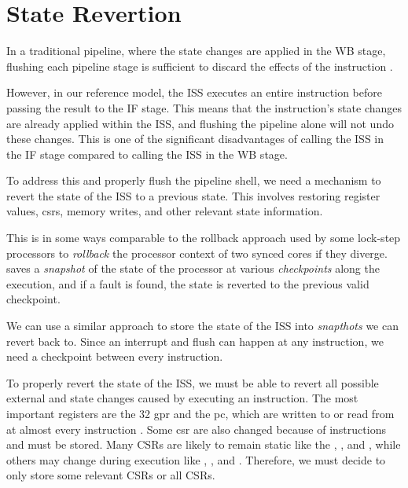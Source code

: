 %


\section{State Revertion}
\label{sec:ps_revertion}

In a traditional pipeline, where the state changes are applied in the WB stage, flushing each pipeline stage is sufficient to discard the effects of the instruction \cite{pattersonComputerOrganizationDesign2021}.

However, in our reference model, the ISS executes an entire instruction before passing the result to the IF stage.
This means that the instruction's state changes are already applied within the ISS, and flushing the pipeline alone will not undo these changes. This is one of the significant disadvantages of calling the ISS in the IF stage compared to calling the ISS in the WB stage.

To address this and properly flush the pipeline shell, we need a mechanism to revert the state of the ISS to a previous state.
This involves restoring register values, \acrshort{csr}s, memory writes, and other relevant state information.

This is in some ways comparable to the rollback approach used by some lock-step processors \cite{marquesLockVHeterogeneousFault2021, liDuckCoreFaultTolerantProcessor2021, nikiemaDesignLowComplexity2023} to \textit{rollback} the processor context of two synced cores if they diverge. \textcite{marquesLockVHeterogeneousFault2021} saves a \textit{snapshot} of the state of the processor at various \textit{checkpoints} along the execution, and if a fault is found, the state is reverted to the previous valid checkpoint.

We can use a similar approach to store the state of the ISS into \textit{snapthots} we can revert back to. Since an interrupt and flush can happen at any instruction, we need a checkpoint between every instruction.


To properly revert the state of the ISS, we must be able to revert all possible external and state changes caused by executing an instruction. The most important registers are the 32 \acrfull{gpr} and the \acrfull{pc}, which are written to or read from at almost every instruction \cite{watermanRISCVInstructionSet2019}.
Some \acrfull{csr} are also changed because of instructions and must be stored. Many CSRs are likely to remain static like the , , and , while others may change during execution like , , and  \cite{watermanRISCVInstructionSet2021}. Therefore, we must decide to only store some relevant CSRs or all CSRs.

